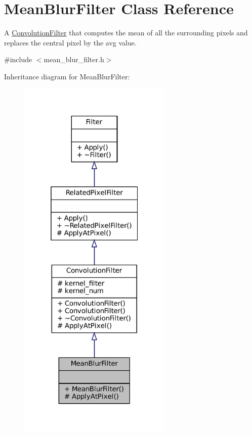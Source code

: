\hypertarget{classMeanBlurFilter}{}\section{Mean\+Blur\+Filter Class Reference}
\label{classMeanBlurFilter}


A \hyperlink{classConvolutionFilter}{Convolution\+Filter} that computes the mean of all the surrounding pixels and replaces the central pixel by the avg value.  




{\ttfamily \#include $<$mean\+\_\+blur\+\_\+filter.\+h$>$}



Inheritance diagram for Mean\+Blur\+Filter\+:\nopagebreak
\begin{figure}[H]
\begin{center}
\leavevmode
\includegraphics[width=208pt]{classMeanBlurFilter__inherit__graph}
\end{center}
\end{figure}


